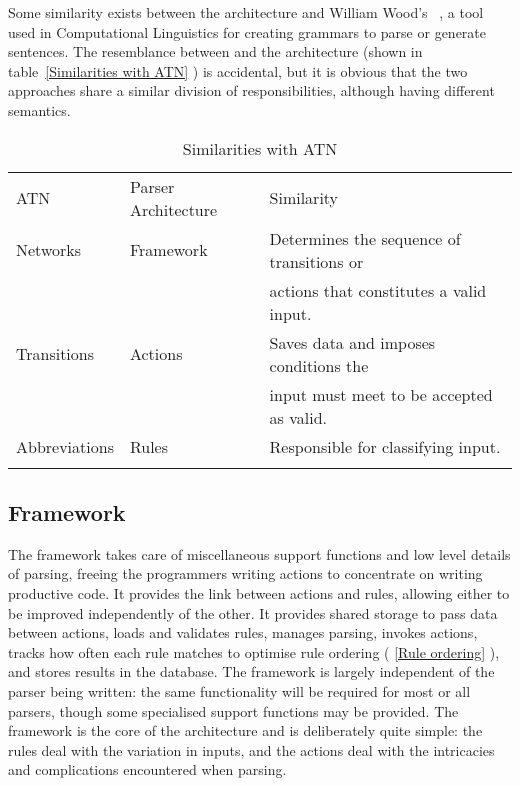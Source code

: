 \documentclass{svmult}
\newcommand{\tabletopline}[0]{%
    \hline%
    \noalign{\smallskip}%
}
\newcommand{\tablebottomline}[0]{%
    \noalign{\smallskip}%
    \hline%
}
\newcommand{\tablemiddleline}[0]{%
    \noalign{\smallskip}%
    \hline%
    \noalign{\smallskip}%
}
\newcommand{\sectionref}[1]{%
    \textsection{}\vref*{#1}%
}
\newcommand{\refwithlabel}[2]{%
    #1~\vref{#2}%
}
\newcommand{\tableref}[1]{%
    \refwithlabel{table}{#1}%
}
\begin{document}
Some similarity exists between the architecture and William Wood's
\ATN{}~\cite{atns, nlpip}, a tool used in Computational Linguistics for
creating grammars to parse or generate sentences.  The resemblance between
\ATN{} and the architecture (shown in \tableref{Similarities with ATN}) is
accidental, but it is obvious that the two approaches share a similar
division of responsibilities, although having different semantics.


\begin{table}[hbtp]
    \caption{Similarities with ATN}\label{Similarities with ATN}
    \begin{tabular}[]{lll}
        \tabletopline{}%
        ATN           & Parser Architecture & Similarity                                \\
        \tablemiddleline{}%
        Networks      & Framework           & Determines the sequence of transitions or \\
                      &                     & actions that constitutes a valid input.   \\
        Transitions   & Actions             & Saves data and imposes conditions the     \\
                      &                     & input must meet to be accepted as valid.  \\
        Abbreviations & Rules               & Responsible for classifying input.        \\
        \tablebottomline{}%
    \end{tabular}
\end{table}

\subsection{Framework}

\label{Framework}

The framework takes care of miscellaneous support functions and low level
details of parsing, freeing the programmers writing actions to concentrate
on writing productive code.  It provides the link between actions and
rules, allowing either to be improved independently of the other.  It
provides shared storage to pass data between actions, loads and validates
rules, manages parsing, invokes actions, tracks how often each rule matches
to optimise rule ordering (\sectionref{Rule ordering}), and stores results
in the database.  The framework is largely independent of the parser being
written: the same functionality will be required for most or all parsers,
though some specialised support functions may be provided.  The framework
is the core of the architecture and is deliberately quite simple: the rules
deal with the variation in inputs, and the actions deal with the
intricacies and complications encountered when parsing.
\end{document}

